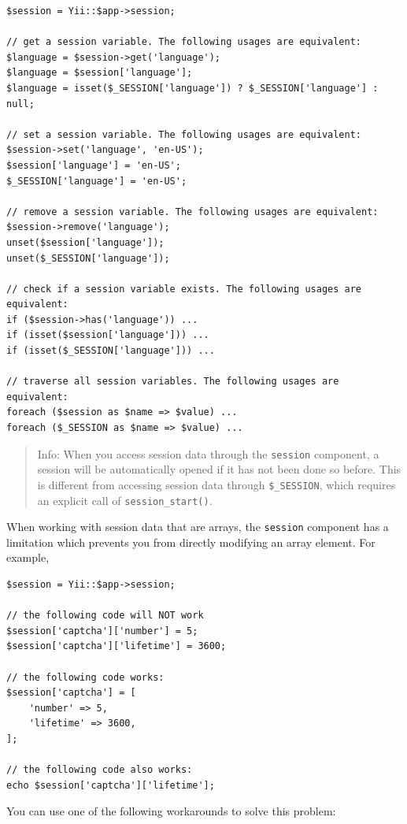\lstset{language=php}\begin{lstlisting}
$session = Yii::$app->session;

// get a session variable. The following usages are equivalent:
$language = $session->get('language');
$language = $session['language'];
$language = isset($_SESSION['language']) ? $_SESSION['language'] : null;

// set a session variable. The following usages are equivalent:
$session->set('language', 'en-US');
$session['language'] = 'en-US';
$_SESSION['language'] = 'en-US';

// remove a session variable. The following usages are equivalent:
$session->remove('language');
unset($session['language']);
unset($_SESSION['language']);

// check if a session variable exists. The following usages are equivalent:
if ($session->has('language')) ...
if (isset($session['language'])) ...
if (isset($_SESSION['language'])) ...

// traverse all session variables. The following usages are equivalent:
foreach ($session as $name => $value) ...
foreach ($_SESSION as $name => $value) ...
\end{lstlisting}
\begin{quote}Info: When you access session data through the \lstinline|session| component, a session will be automatically opened
if it has not been done so before. This is different from accessing session data through \lstinline|$_SESSION|, which requires
an explicit call of \lstinline|session_start()|.

\end{quote}
When working with session data that are arrays, the \lstinline|session| component has a limitation which prevents you from
directly modifying an array element. For example,

\lstset{language=php}\begin{lstlisting}
$session = Yii::$app->session;

// the following code will NOT work
$session['captcha']['number'] = 5;
$session['captcha']['lifetime'] = 3600;

// the following code works:
$session['captcha'] = [
    'number' => 5,
    'lifetime' => 3600,
];

// the following code also works:
echo $session['captcha']['lifetime'];
\end{lstlisting}
You can use one of the following workarounds to solve this problem:

